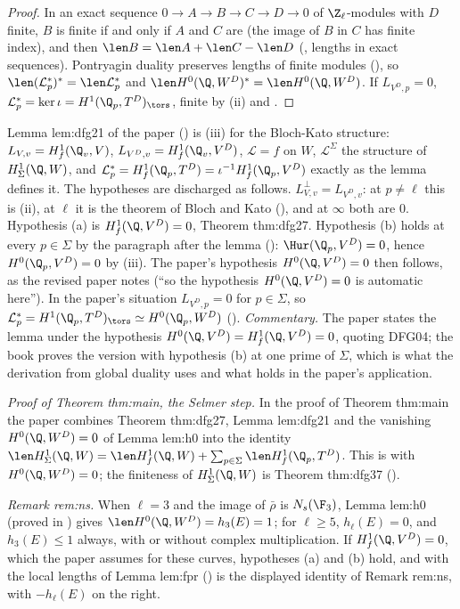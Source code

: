 \begin{proof}
In an exact sequence $0\to A\to B\to C\to D\to0$ of $\Z_\ell$-modules with $D$ finite, $B$ is finite if and only if $A$ and $C$ are (the image of $B$ in $C$ has finite index), and then
$\len B=\len A+\len C-\len D$ (, lengths in exact sequences). Pontryagin duality preserves lengths of finite modules (), so
$\len(\mathcal L^*_p)^*=\len\mathcal L^*_p$ and $\len H^0(\Q,W^D)^*=\len H^0(\Q,W^D)$. If $L_{V^D,p}=0$, $\mathcal L^*_p=\ker\iota=H^1(\Q_p,T^D)_{\tors}$, finite by (ii) and
.
\end{proof}

\begin{paperlink}\label{pl:galcoh:dfg21}
Lemma lem:dfg21 of the paper (\cite[Lemma 2.1]{DFG04}) is (iii) for the Bloch-Kato structure: $L_{V,v}=H^1_f(\Q_v,V)$, $L_{V^D,v}=H^1_f(\Q_v,V^D)$,
$\mathcal L=f$ on $W$, $\mathcal L^\Sigma$ the structure of $H^1_\Sigma(\Q,W)$, and $\mathcal L^*_p=H^1_f(\Q_p,T^D)=\iota^{-1}H^1_f(\Q_p,V^D)$ exactly as the lemma defines it. The hypotheses are discharged as
follows. $L_{V,v}^\perp=L_{V^D,v}$: at $p\ne\ell$ this is (ii), at $\ell$ it is the theorem of Bloch and Kato (), and at $\infty$ both
are $0$. Hypothesis (a) is $H^1_f(\Q,V^D)=0$, Theorem thm:dfg27. Hypothesis (b) holds at every $p\in\Sigma$ by the paragraph after the lemma
(): $\Hur(\Q_p,V^D)=0$, hence $H^0(\Q_p,V^D)=0$ by (iii). The paper's hypothesis $H^0(\Q,V^D)=0$ then
follows, as the revised paper notes (``so the hypothesis $H^0(\Q,V^D)=0$ is automatic here''). In the paper's situation $L_{V^D,p}=0$ for $p\in\Sigma$, so
$\mathcal L^*_p=H^1(\Q_p,T^D)_{\tors}\simeq H^0(\Q_p,W^D)$ (). \emph{Commentary.} The paper states the lemma under the hypothesis
$H^0(\Q,V^D)=H^1_f(\Q,V^D)=0$, quoting DFG04; the book proves the version with hypothesis (b) at one prime of $\Sigma$, which is what the derivation from global duality uses
and what holds in the paper's application.

\emph{Proof of Theorem thm:main, the Selmer step.} In the proof of Theorem thm:main the paper combines Theorem thm:dfg27, Lemma lem:dfg21 and the vanishing
$H^0(\Q,W^D)=0$ of Lemma lem:h0 into the identity $\len H^1_\Sigma(\Q,W)=\len H^1_f(\Q,W)+\sum_{p\in\Sigma}\len H^1_f(\Q_p,T^D)$. This is  with
$H^0(\Q,W^D)=0$; the finiteness of $H^1_\Sigma(\Q,W)$ is Theorem thm:dfg37 ().

\emph{Remark rem:ns.} When $\ell=3$ and the image of $\bar\rho$ is $N_s(\F_3)$, Lemma lem:h0 (proved in ) gives $\len H^0(\Q,W^D)=h_3(E)=1$; for $\ell\ge5$,
$h_\ell(E)=0$, and $h_3(E)\le1$ always, with or without complex multiplication. If $H^1_f(\Q,V^D)=0$, which the paper assumes for these curves, hypotheses (a) and (b) hold,
and  with the local lengths of Lemma lem:fpr () is the displayed identity of Remark rem:ns, with $-h_\ell(E)$ on the right.
\end{paperlink}

